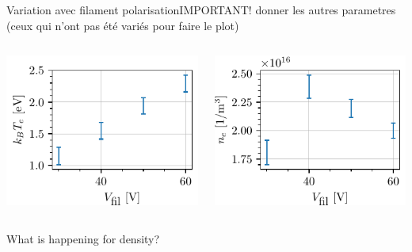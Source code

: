 \documentclass[10pt]{beamer}
\begin{document}
\begin{frame}{Variation avec filament polarisation}{IMPORTANT! donner les autres parametres (ceux qui n'ont pas été variés pour faire le plot)}
    \begin{columns}
        \centering
        \includegraphics[scale=1]{../figures/temperatureeV_filament_polarisation.pdf}


        \centering
        \includegraphics[scale=1]{../figures/density_filament_polarisation.pdf}

    \end{columns}
    What is happening for density?
\end{frame}
\end{document}
